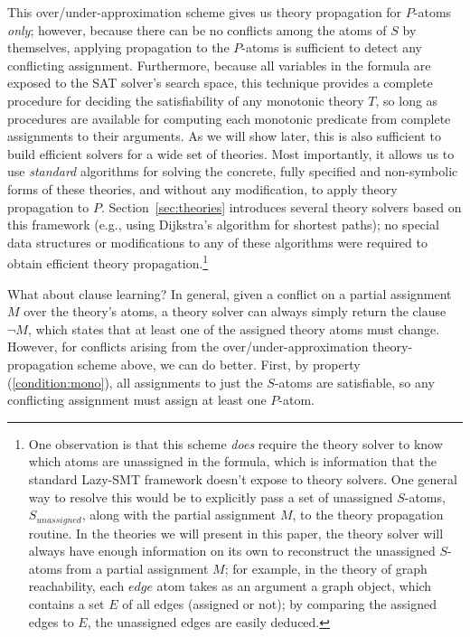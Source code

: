 \documentclass[runningheads]{llncs}
\begin{document}
This over/under-approximation scheme gives us theory propagation for $P$-atoms \textit{only};
however, because there can be no conflicts among the atoms of $S$ by themselves, applying propagation to the $P$-atoms is 
sufficient to detect any conflicting assignment. Furthermore, because all variables in the formula are exposed to the SAT solver's search space,
this technique provides a complete procedure for deciding the satisfiability of any monotonic theory $T$,
so long as procedures are available for computing each monotonic predicate from complete assignments to their arguments.
As we will show later,
this is also sufficient to build efficient solvers for a wide set of
theories. Most importantly, it allows us to use \textit{standard}
algorithms for solving the concrete, fully specified and non-symbolic
forms of these theories, and without any modification, to apply theory propagation to $P$.
Section~\ref{sec:theories}
introduces several theory solvers based on this framework
(e.g., using Dijkstra's algorithm for shortest paths);
no special data structures or modifications to any of these
algorithms were required to obtain efficient theory propagation.\footnote{One observation is that this scheme \textit{does} require the theory solver
to know which atoms are unassigned in the formula, which is information that the
standard Lazy-SMT framework doesn't expose to theory solvers. 
One general way to resolve this would be to explicitly pass a set of unassigned
$S$-atoms, $S_{unassigned}$, along with the partial assignment $M$, to the theory
propagation routine. In the theories we will present in this
paper, the theory solver will always have enough information on its own to reconstruct
the unassigned $S$-atoms from a partial assignment $M$; for example, in the 
theory of graph reachability, each $edge$ atom takes as an argument a 
graph object, which contains a set $E$ of all edges (assigned or not); 
by comparing the assigned edges to $E$, the unassigned edges are easily deduced.}

What about clause learning? In general, given a conflict on
a partial assignment $M$ over the theory's atoms, a theory solver
can always simply return the clause $\lnot M$, which states that at
least one of the assigned theory atoms must change. However,
for conflicts arising from the over/under-approximation
theory-propagation scheme above, we can do better. First, by property (\ref{condition:mono}),
all assignments to just the $S$-atoms are satisfiable, so any conflicting
assignment must assign at least one $P$-atom.
\end{document}
